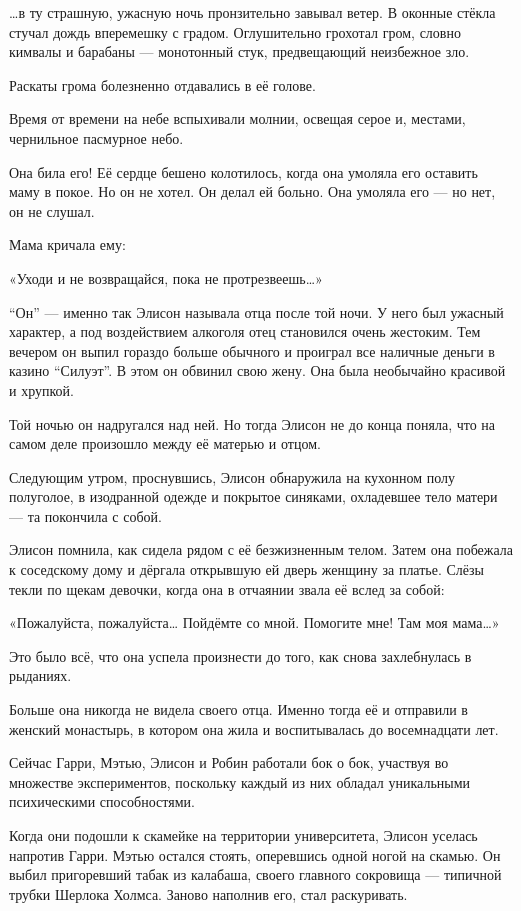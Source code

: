 \documentclass[a5paper, 9pt,
final, openany, twoside=true]{memoir}
\begin{document}
…в ту страшную, ужасную ночь пронзительно завывал ветер. В оконные стёкла стучал дождь вперемешку с градом. Оглушительно грохотал гром, словно кимвалы и барабаны — монотонный стук, предвещающий неизбежное зло.\bigskip

Раскаты грома болезненно  отдавались в её голове.\bigskip

Время от времени на небе вспыхивали молнии, освещая серое и, местами, чернильное пасмурное небо.

Она била его! Её сердце бешено колотилось, когда она умоляла его оставить маму в покое. Но он не хотел. Он делал ей больно. Она умоляла его — но нет, он не слушал.

Мама кричала ему:

«Уходи и не возвращайся, пока не протрезвеешь…»\bigskip

``Он'' — именно так Элисон называла отца после той ночи. У него был ужасный характер, а под воздействием алкоголя отец становился очень жестоким. Тем вечером он выпил гораздо больше обычного и проиграл все наличные деньги в казино ``Силуэт''. В этом он обвинил свою жену. Она была необычайно красивой и хрупкой.

Той ночью он надругался над ней. Но тогда Элисон не до конца поняла, что на самом деле произошло между её матерью и отцом.

Следующим утром, проснувшись, Элисон обнаружила на кухонном полу полуголое, в изодранной одежде и покрытое синяками, охладевшее тело матери — та покончила с собой.

Элисон помнила, как сидела рядом с её безжизненным телом. Затем она побежала к соседскому дому и дёргала открывшую ей дверь женщину за платье. Слёзы текли по щекам девочки, когда она в отчаянии звала её вслед за собой:

«Пожалуйста, пожалуйста… Пойдёмте со мной. Помогите мне! Там моя мама…»

Это было всё, что она успела произнести до того, как снова захлебнулась в рыданиях.

Больше она никогда не видела своего отца. Именно тогда её и отправили в женский монастырь, в котором она жила и воспитывалась до восемнадцати лет.\bigskip

Сейчас Гарри, Мэтью, Элисон и Робин работали бок о бок, участвуя во множестве экспериментов, поскольку каждый из них обладал уникальными психическими способностями.\bigskip

Когда они подошли к скамейке на территории университета, Элисон уселась напротив Гарри. Мэтью остался стоять, оперевшись одной ногой на скамью. Он выбил пригоревший табак из калабаша, своего главного сокровища — типичной трубки Шерлока Холмса. Заново наполнив его, стал раскуривать.\bigskip
\end{document}
